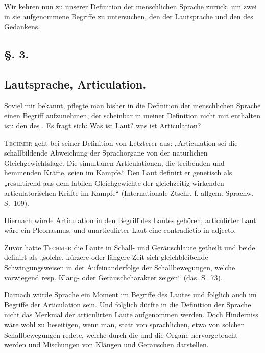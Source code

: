 Wir kehren nun zu unserer Definition der menschlichen Sprache zurück, um zwei in sie aufgenommene Begriffe zu untersuchen, den der Lautsprache und den des Gedankens.

\subsection*{§. 3.}\label{I.I.3}
\subsection*{Lautsprache, Articulation.}

Soviel mir bekannt, pflegte man bisher in die Definition der menschlichen Sprache einen Begriff aufzunehmen, der scheinbar in meiner Definition nicht mit enthalten ist: den des . Es fragt sich: Was ist Laut? was ist Articulation?

\begin{sloppypar}\textsc{Techmer} geht bei seiner Definition von Letzterer aus: „Articulation sei die schallbildende Abweichung der Sprachorgane von der natürlichen Gleichgewichtslage. Die simultanen Articulationen, die treibenden und hemmenden Kräfte, seien im Kampfe.“ Den Laut definirt er genetisch als „resultirend aus dem \label{sp.5} labilen Gleichgewichte der gleichzeitig wirkenden articulatorischen Kräfte im Kampfe“ (Internationale Ztschr. f. allgem. Sprachw.  S.~109).\end{sloppypar}

Hiernach würde Articulation in den Begriff des Lautes gehören; articulirter Laut wäre ein Pleonasmus, und unarticulirter Laut eine contradictio in adjecto.

Zuvor hatte \textsc{Techmer} die Laute in Schall- und Geräuschlaute getheilt und beide definirt als „solche, kürzere oder längere Zeit sich gleichbleibende Schwingungsweisen in der Aufeinanderfolge der  Schallbewegungen, welche vorwiegend resp. Klang- oder Geräuschcharakter zeigen“ (das. S.~73).

Darnach würde Sprache ein Moment im Begriffe des Lautes und folglich auch im Begriffe der Articulation sein. Und folglich dürfte in die Definition der Sprache nicht das Merkmal der articulirten Laute aufgenommen werden. Doch  Hinderniss wäre wohl zu beseitigen, wenn man, statt von sprachlichen, etwa von solchen Schallbewegungen redete, \label{fp.6} welche durch die und die Organe hervorgebracht werden und Mischungen von Klängen und Geräuschen darstellen.

